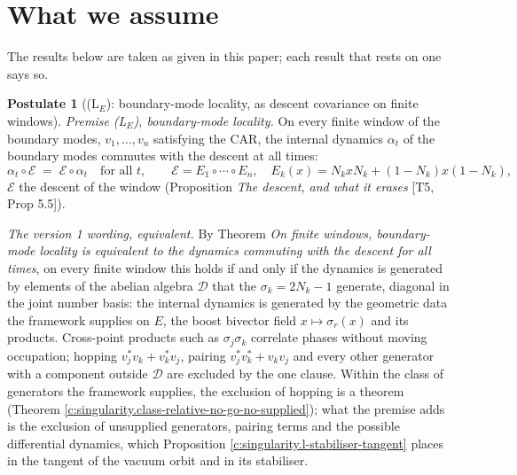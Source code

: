 \documentclass[11pt]{article}
\theoremstyle{definition}
\newtheorem{postulate}[theorem]{Postulate}
\theoremstyle{plain}
\begin{document}
\section*{What we assume}
The results below are taken as given in this paper; each result that rests on one says so.
\begin{postulate}[(L$_E$): boundary-mode locality, as descent covariance on finite windows]\label{c:singularity.l-boundary-mode-locality}
\emph{Premise (L$_{E}$), boundary-mode locality.} On every finite window of the boundary modes, $v_{1}, \dots, v_{n}$ satisfying the CAR, the internal dynamics $\alpha_{t}$ of the boundary modes commutes with the descent at all times:
\[
\alpha_{t}\circ\mathcal{E} \;=\; \mathcal{E}\circ\alpha_{t} \quad \text{for all } t, \qquad \mathcal{E} = E_{1}\circ\cdots\circ E_{n}, \quad E_{k}(x) = N_{k}xN_{k} + (1 - N_{k})x(1 - N_{k}),
\]
$\mathcal{E}$ the descent of the window (Proposition \emph{The descent, and what it erases} [T5, Prop 5.5]).

\emph{The version 1 wording, equivalent.} By Theorem \emph{On finite windows, boundary-mode locality is equivalent to the dynamics commuting with the descent for all times}, on every finite window this holds if and only if the dynamics is generated by elements of the abelian algebra $\mathcal{D}$ that the $\sigma_{k} = 2N_{k} - 1$ generate, diagonal in the joint number basis: the internal dynamics is generated by the geometric data the framework supplies on $E$, the boost bivector field $x \mapsto \sigma_{r}(x)$ and its products. Cross-point products such as $\sigma_{j}\sigma_{k}$ correlate phases without moving occupation; hopping $v_{j}^{*}v_{k} + v_{k}^{*}v_{j}$, pairing $v_{j}^{*}v_{k}^{*} + v_{k}v_{j}$ and every other generator with a component outside $\mathcal{D}$ are excluded by the one clause. Within the class of generators the framework supplies, the exclusion of hopping is a theorem (Theorem \ref{c:singularity.class-relative-no-go-no-supplied}); what the premise adds is the exclusion of unsupplied generators, pairing terms and the possible differential dynamics, which Proposition \ref{c:singularity.l-stabiliser-tangent} places in the tangent of the vacuum orbit and in its stabiliser.


\end{postulate}
\end{document}
